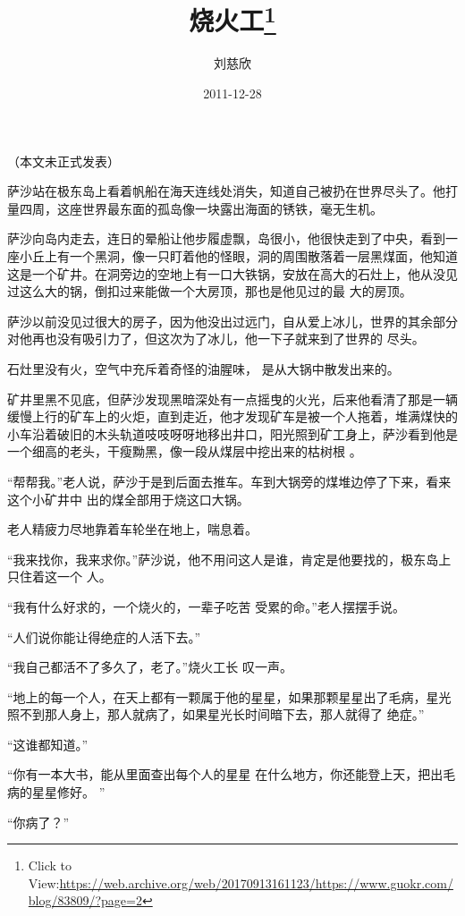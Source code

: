 \documentclass{article}
\title{烧火工\footnote{Click to View:\url{https://web.archive.org/web/20170913161123/https://www.guokr.com/blog/83809/?page=2}}}
\author{刘慈欣}
\date{2011-12-28}
\begin{document}

\maketitle


\Large


﻿（本文未正式发表） 

萨沙站在极东岛上看着帆船在海天连线处消失，知道自己被扔在世界尽头了。他打量四周，这座世界最东面的孤岛像一块露出海面的锈铁，毫无生机。
 

萨沙向岛内走去，连日的晕船让他步履虚飘，岛很小，他很快走到了中央，看到一座小丘上有一个黑洞，像一只盯着他的怪眼，洞的周围散落着一层黑煤面，他知道这是一个矿井。在洞旁边的空地上有一口大铁锅，安放在高大的石灶上，他从没见过这么大的锅，倒扣过来能做一个大房顶，那也是他见过的最
大的房顶。 

\newpage

萨沙以前没见过很大的房子，因为他没出过远门，自从爱上冰儿，世界的其余部分对他再也没有吸引力了，但这次为了冰儿，他一下子就来到了世界的
尽头。 

石灶里没有火，空气中充斥着奇怪的油腥味，
是从大锅中散发出来的。 

矿井里黑不见底，但萨沙发现黑暗深处有一点摇曳的火光，后来他看清了那是一辆缓慢上行的矿车上的火炬，直到走近，他才发现矿车是被一个人拖着，堆满煤快的小车沿着破旧的木头轨道吱吱呀呀地移出井口，阳光照到矿工身上，萨沙看到他是一个细高的老头，干瘦黝黑，像一段从煤层中挖出来的枯树根
。 

“帮帮我。”老人说，萨沙于是到后面去推车。车到大锅旁的煤堆边停了下来，看来这个小矿井中
出的煤全部用于烧这口大锅。 

老人精疲力尽地靠着车轮坐在地上，喘息着。
\newpage


“我来找你，我来求你。”萨沙说，他不用问这人是谁，肯定是他要找的，极东岛上只住着这一个
人。 

“我有什么好求的，一个烧火的，一辈子吃苦
受累的命。”老人摆摆手说。 


“人们说你能让得绝症的人活下去。” 

“我自己都活不了多久了，老了。”烧火工长
叹一声。 

“地上的每一个人，在天上都有一颗属于他的星星，如果那颗星星出了毛病，星光照不到那人身上，那人就病了，如果星光长时间暗下去，那人就得了
绝症。” 


“这谁都知道。” 

“你有一本大书，能从里面查出每个人的星星
\newpage
在什么地方，你还能登上天，把出毛病的星星修好。
” 


“你病了？” 
\end{document}

